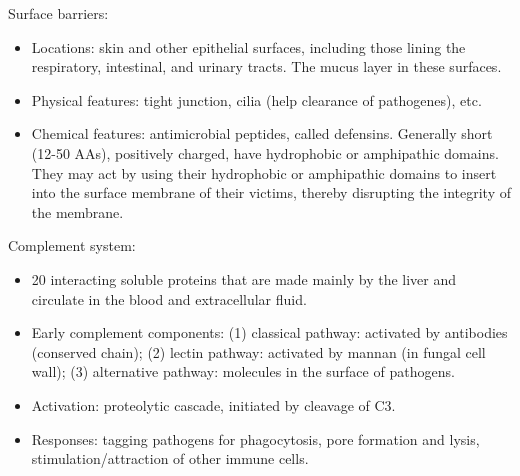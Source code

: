 \documentclass{report}
\begin{document}
Surface barriers: 
\begin{itemize}
	\item Locations: skin and other epithelial surfaces, including those lining the respiratory, intestinal, and urinary tracts. The mucus layer in these surfaces. 
	\item Physical features: tight junction, cilia (help clearance of pathogenes), etc. 
	\item Chemical features: antimicrobial peptides, called defensins. Generally short (12-50 AAs), positively charged, have hydrophobic or amphipathic domains. They may act by using their hydrophobic or amphipathic domains to insert into the surface membrane of their victims, thereby disrupting the integrity of the membrane. 
\end{itemize}

Complement system: 
\begin{itemize}
	\item 20 interacting soluble proteins that are made mainly by the liver and circulate in the blood and extracellular fluid.
	\item Early complement components: (1) classical pathway: activated by antibodies (conserved chain); (2) lectin pathway: activated by mannan (in fungal cell wall); (3) alternative pathway: molecules in the surface of pathogens. 
	\item Activation: proteolytic cascade, initiated by cleavage of C3. 
	\item Responses: tagging pathogens for phagocytosis, pore formation and lysis, stimulation/attraction of other immune cells. 
\end{itemize}
\end{document}
